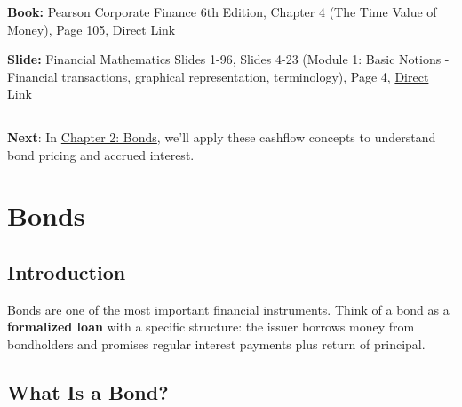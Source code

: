 \documentclass[
  letterpaper,
]{scrbook}
\begin{document}
\begin{tcolorbox}[enhanced jigsaw, toptitle=1mm, colbacktitle=quarto-callout-caution-color!10!white, opacityback=0, leftrule=.75mm, breakable, colframe=quarto-callout-caution-color-frame, toprule=.15mm, opacitybacktitle=0.6, coltitle=black, bottomrule=.15mm, colback=white, arc=.35mm, titlerule=0mm, rightrule=.15mm, left=2mm, title=\textcolor{quarto-callout-caution-color}{\faFire}\hspace{0.5em}{References}, bottomtitle=1mm]

\textbf{Book:} Pearson Corporate Finance 6th Edition, Chapter 4 (The
Time Value of Money), Page 105,
\href{https://cdn.jsdelivr.net/gh/mrbungie/financial_maths@main/resources/books/pearson_corporate_finance_6th.pdf\#page=105}{Direct
Link}

\textbf{Slide:} Financial Mathematics Slides 1-96, Slides 4-23 (Module
1: Basic Notions - Financial transactions, graphical representation,
terminology), Page 4,
\href{https://cdn.jsdelivr.net/gh/mrbungie/financial_maths@main/resources/slideshows/25_09_30_FinancialMathematics_Slides_1_96.pdf\#page=4}{Direct
Link}

\end{tcolorbox}

\begin{center}\rule{0.5\linewidth}{0.5pt}\end{center}

\textbf{Next}: In \href{bonds.qmd}{Chapter 2: Bonds}, we'll apply these
cashflow concepts to understand bond pricing and accrued interest.


\chapter{Bonds}\label{bonds}

\section{Introduction}\label{introduction-1}

Bonds are one of the most important financial instruments. Think of a
bond as a \textbf{formalized loan} with a specific structure: the issuer
borrows money from bondholders and promises regular interest payments
plus return of principal.

\section{What Is a Bond?}\label{what-is-a-bond}
\end{document}
